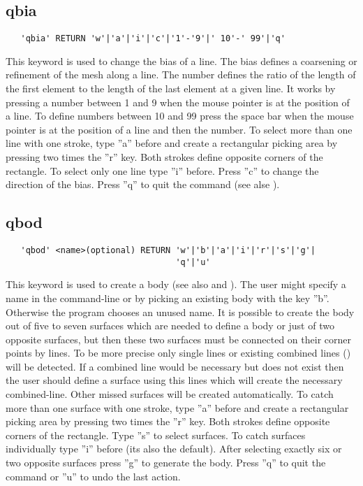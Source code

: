 \documentclass{article}
\begin{document}
\subsection{\label{qbia}qbia}
\begin{verbatim}
   'qbia' RETURN 'w'|'a'|'i'|'c'|'1'-'9'|' 10'-' 99'|'q' 
\end{verbatim}
This keyword is used to change the bias of a line. The bias defines a coarsening or refinement of the mesh along a line. The number defines the ratio of the length of the first element to the length of the last element at a given line. It works by pressing a number between 1 and 9 when the mouse pointer is at the position of a line. To define numbers between 10 and 99 press the space bar when the mouse pointer is at the position of a line and then the number. To select more than one line with one stroke, type ''a'' before and create a rectangular picking area by pressing two times the ''r'' key. Both strokes define opposite corners of the rectangle. To select only one line type ''i'' before. Press ''c'' to change the direction of the bias. Press ''q'' to quit the command (see alse ). 

\subsection{\label{qbod}qbod}
\begin{verbatim}
   'qbod' <name>(optional) RETURN 'w'|'b'|'a'|'i'|'r'|'s'|'g'|
                                  'q'|'u'
\end{verbatim}
This keyword is used to create a body (see also  and ). The user might specify a name in the command-line or by picking an existing body with the key ''b''. Otherwise the program chooses an unused name. It is possible to create the body out of five to seven surfaces which are needed to define a body or just of two opposite surfaces, but then these two surfaces must be connected on their corner points by lines. To be more precise only single lines or existing combined lines () will be detected. If a combined line would be necessary but does not exist then the user should define a surface using this lines which will create the necessary combined-line. Other missed surfaces will be created automatically. To catch more than one surface with one stroke, type ''a'' before and create a rectangular picking area by pressing two times the ''r'' key. Both strokes define opposite corners of the rectangle. Type ''s'' to select surfaces. To catch surfaces individually type ''i'' before (its also the default). After selecting exactly six or two opposite surfaces press ''g'' to generate the body. Press ''q'' to quit the command or ''u'' to undo the last action.
\end{document}
